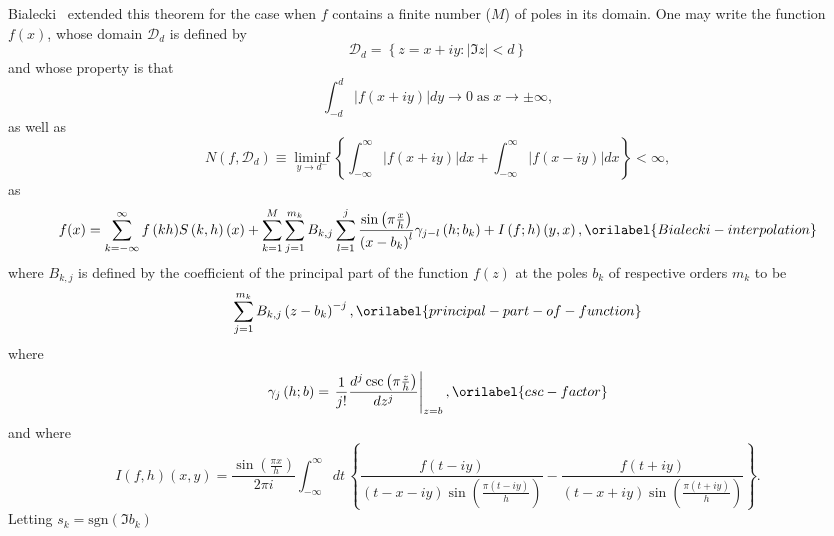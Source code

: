 \documentclass[aps,showkeys,noshowpacs,superscriptaddress,pre,preprint]{revtex4-2}
\let\label\orilabel
\begin{document}
Bialecki~\cite{Bialecki1989} extended this theorem for the case when $f$ contains 
a finite number ($M$) of poles in its domain.
One may write the function $f (x)$,
whose domain $\mathcal{D}_d$ is defined by
\begin{equation*}
\mathcal{D}_d = \left\{ z = x + i y : \left\vert \Im{z} \right\vert < d \right\}
\end{equation*}
and whose property is that
\begin{equation*}
\int_{-d}^{d} \left\vert {f \left( x + i y \right)} \right\vert dy \rightarrow 0
\; \mathrm{as} \;
x \rightarrow \pm \infty ,
\end{equation*}
as well as
\begin{equation*}
N \left( f , \mathcal{D}_d \right) \equiv
\liminf_{y \rightarrow d^-}
\left\{
\int_{-\infty}^{\infty} \left\vert {f \left( x + i y \right)} \right\vert  dx
+ \int_{-\infty}^{\infty} \left\vert {f \left( x - i y \right)} \right\vert  dx
\right\} < \infty ,
\end{equation*}
as
\begin{equation}
{f (x)} = \sum_{k = -\infty}^{\infty} {f \left( k h \right)} {S \left( k, h \right) (x)}
+ \sum_{k = 1}^{M} \sum_{j = 1}^{m_k} B_{k,j} \sum_{l = 1}^{j} 
\frac{\sin\left( \pi \frac{x}{h} \right)}{\left( x - b_k \right)^l}
\gamma_{j-l} \left( h; b_k \right)
+ I \left( f; h \right) \left( y, x \right) ,
\label{Bialecki-interpolation}
\end{equation}
where $B_{k,j}$ is defined by the coefficient of the principal part of the function $f (z)$ 
at the poles $b_k$ of respective orders $m_k$ to be
\begin{equation}
\sum_{j = 1}^{m_k} B_{k, j} \left( z - b_k \right)^{-j} ,
\label{principal-part-of-function}
\end{equation}
where
\begin{equation}
\gamma_j \left( h ; b \right) = \left. \frac{1}{j !} \frac{d^j \csc \left( \pi \frac{z}{h} \right)}{d z^j} \right\vert_{z=b} ,
\label{csc-factor}
\end{equation}
and where
\begin{equation*}
{I (f, h) (x, y)} = \frac{\sin\left( \frac{\pi x }{h} \right)}{2 \pi i} \int_{-\infty}^{\infty} dt \,
\left\{
\frac{f\left( t - i y \right)}{\left( t - x - i y \right) \sin\left( \frac{\pi \left( t - i y \right)}{h} \right) }
-
\frac{f\left( t + i y \right)}{\left( t - x + i y \right) \sin\left( \frac{\pi \left( t + i y \right)}{h} \right) }
\right\} .
\end{equation*}
Letting $s_k = \mathrm{sgn} \left( \Im b_k \right)$
\end{document}
